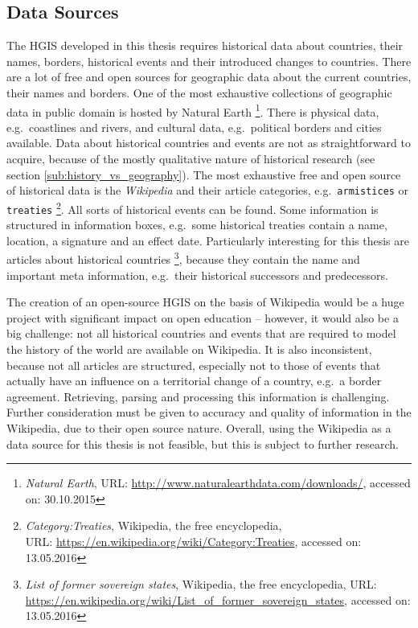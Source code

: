 
\subsection{Data Sources} %
\label{sub:data_sources}

The HGIS developed in this thesis requires historical data about countries, their names, borders, historical events and their introduced changes to countries. There are a lot of free and open sources for geographic data about the current countries, their names and borders. One of the most exhaustive collections of geographic data in public domain is hosted by Natural Earth
\footnote{
  \textit{Natural Earth},
  URL: \url{http://www.naturalearthdata.com/downloads/},
  accessed on: 30.10.2015
}.
There is physical data, e.g.\ coastlines and rivers, and cultural data, e.g.\ political borders and cities available.
Data about historical countries and events are not as straightforward to acquire, because of the mostly qualitative nature of historical research (see section \ref{sub:history_vs_geography}). The most exhaustive free and open source of historical data is the \emph{Wikipedia} and their article categories, e.g.\ \texttt{armistices} or \texttt{treaties}
\footnote{
  \textit{Category:Treaties},
  Wikipedia, the free encyclopedia,\\
  URL: \url{https://en.wikipedia.org/wiki/Category:Treaties},
  accessed on: 13.05.2016
}.
All sorts of historical events can be found. Some information is structured in information boxes, e.g.\ some historical treaties contain a name, location, a signature and an effect date. Particularly interesting for this thesis are articles about historical countries
\footnote{
  \textit{List of former sovereign states},
  Wikipedia, the free encyclopedia,
  URL: \url{https://en.wikipedia.org/wiki/List_of_former_sovereign_states},
  accessed on: 13.05.2016
},
because they contain the name and important meta information, e.g.\ their historical successors and predecessors.

The creation of an open-source HGIS on the basis of Wikipedia would be a huge project with significant impact on open education -- however, it would also be a big challenge: not all historical countries and events that are required to model the history of the world are available on Wikipedia. It is also inconsistent, because not all articles are structured, especially not to those of events that actually have an influence on a territorial change of a country, e.g.\ a border agreement. Retrieving, parsing and processing this information is challenging.
Further consideration must be given to accuracy and quality of information in the Wikipedia, due to their open source nature.
Overall, using the Wikipedia as a data source for this thesis is not feasible, but this is subject to further research.

